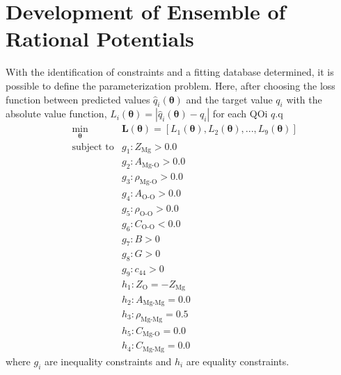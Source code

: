 \section{Development of Ensemble of Rational Potentials}

With the identification of constraints and a fitting database determined, it is possible to define the parameterization problem.  Here, after choosing the loss function between predicted values $\hat{q}_i(\bm{\theta})$ and the target value $q_i$ with the absolute value function, $L_i(\bm{\theta})=|\hat{q}_i(\bm{\theta})-q_i|$ for each QOi $q$.q
\begin{align}
	&\min_{\bm{\theta}} &\bm{L}(\bm{\theta})=[
	    L_1(\bm{\theta}),
			L_2(\bm{\theta}),
			...,
			L_9(\bm{\theta})] \\
	&\text{subject to} &g_1: Z_{\text{Mg}} > 0.0 \\
	& &g_2: A_{\text{Mg-O}} > 0.0 \\
	& &g_3: \rho_{\text{Mg-O}} > 0.0 \\
	& &g_4: A_{\text{O-O}} > 0.0 \\
	& &g_5: \rho_{\text{O-O}} > 0.0 \\
	& &g_6: C_{\text{O-O}} < 0.0 \\
	& &g_7: B > 0 \\
	& &g_8: G > 0 \\
	& &g_9: c_{44} > 0 \\
  & &h_1: Z_{\text{O}} = -Z_{\text{Mg}} \\
  & &h_2: A_{\text{Mg-Mg}} = 0.0 \\
  & &h_3: \rho_{\text{Mg-Mg}} = 0.5 \\
	& &h_5: C_{\text{Mg-O}} = 0.0 \\
  & &h_4: C_{\text{Mg-Mg}} = 0.0
\end{align}
where $g_i$ are inequality constraints and $h_i$ are equality constraints.

